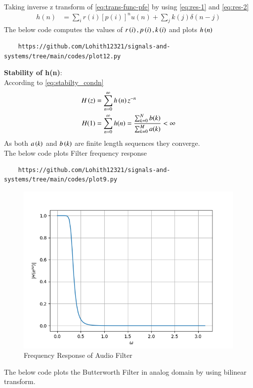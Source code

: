 \documentclass[journal,12pt,twocolumn]{IEEEtran}
\theoremstyle{remark}
\begin{document}
\begin{enumerate}[label=\thesection.\arabic*
,ref=\thesection.\theenumi]
\begin{enumerate}[label=\thesection.\arabic*
,ref=\thesection.\theenumi]
\begin{align}
\end{align}
Taking inverse z transform of \eqref{eq:trans-func-pfe} by using \eqref{eq:res-1} and \eqref{eq:res-2}
\begin{align}
h(n) &= \sum_{i}r(i)[p(i)]^nu(n) + \sum_{j}k(j)\delta(n - j)
	\label{eq:h-n-expr}
\end{align}
The below code computes the values of $r\left(i\right),p\left(i\right) , k\left(i\right)$ and plots $h\left(n\right)$
\begin{lstlisting}
    https://github.com/Lohith12321/signals-and-systems/tree/main/codes/plot12.py 
\end{lstlisting}

\textbf{Stability of h(n)}:\\
According to \eqref{eq:stabilty_condn}
\begin{align}
H\left(z\right) &= \sum_{n = 0}^{\infty} h\left(n\right)z^{-n}\\
H(1)&= \sum_{n = 0}^{\infty}h(n)  = \frac{\sum_{k = 0}^{N}b(k)}{\sum_{k = 0}^{M}a(k)}< \infty
\end{align}
As both $a\left(k\right)$ and $b\left(k\right)$ are finite length sequences they converge.\\
The below code plots Filter frequency response
\begin{lstlisting}
    https://github.com/Lohith12321/signals-and-systems/tree/main/codes/plot9.py 
\end{lstlisting}
\begin{figure}[ht]
\centering
\includegraphics[width=1\columnwidth]{figs/plot9.png}
\caption{Frequency Response of Audio Filter}
\label{fig:plot9}
\end{figure}
The below code plots the Butterworth Filter in analog domain by using bilinear transform.

\end{enumerate}
\end{enumerate}
\end{document}
